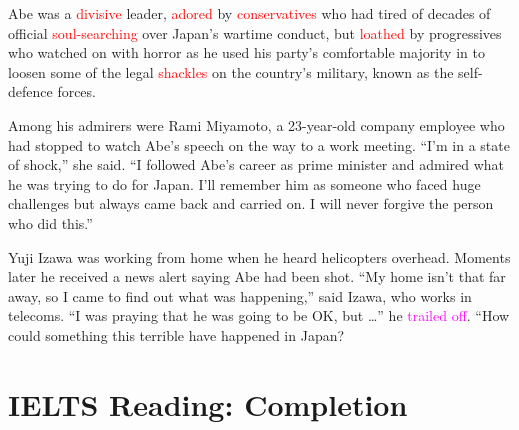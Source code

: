 \documentclass[12pt,a4paper]{article}
\begin{document}
    \par Abe was a \textcolor{red}{divisive}\cite{divisive} leader, \textcolor{red}{adored}\cite{adored} by \textcolor{red}{conservatives}\cite{conservatives} who had tired of decades of official \textcolor{red}{soul-searching}\cite{soul-searching} over Japan’s wartime conduct, but \textcolor{red}{loathed}\cite{loathed} by progressives who watched on with horror as he used his party’s comfortable majority in to loosen some of the legal \textcolor{red}{shackles}\cite{shackles} on the country’s military, known as the self-defence forces.

    \par Among his admirers were Rami Miyamoto, a 23-year-old company employee who had stopped to watch Abe’s speech on the way to a work meeting. “I’m in a state of shock,” she said. “I followed Abe’s career as prime minister and admired what he was trying to do for Japan. I’ll remember him as someone who faced huge challenges but always came back and carried on. I will never forgive the person who did this.”

    \par Yuji Izawa was working from home when he heard helicopters overhead. Moments later he received a news alert saying Abe had been shot. “My home isn’t that far away, so I came to find out what was happening,” said Izawa, who works in telecoms. “I was praying that he was going to be OK, but …” he \textcolor{magenta}{trailed off}\cite{trailed_off}. “How could something this terrible have happened in Japan?

    \printbibliography

\newcommand{\redhighlight}{\textcolor{red}}
\section{IELTS Reading: Completion}
\end{document}
